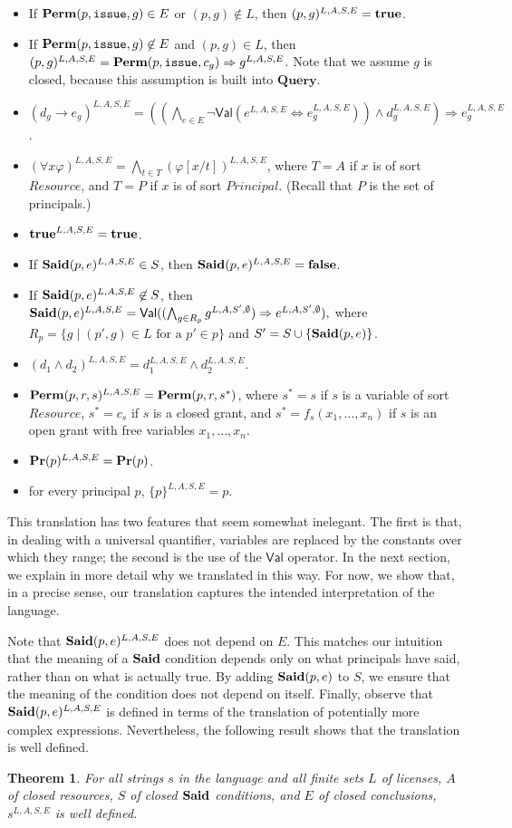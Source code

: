 \documentclass{acmtrans2m}
\newtheorem{theorem}{Theorem}[section]
\newcommand{\thm}{\begin{theorem}}
\newcommand{\ethm}{\end{theorem}}
\newcommand{\rimp}{\Rightarrow}
\newcommand{\<}{
}
\renewcommand{\>}{\rangle}
\newcommand{\union}{\cup}
\renewcommand{\phi}{\varphi}
\newcommand{\Said}{\mathit{\bf Said}}
\newcommand{\true}{\mathit{\bf{true}}}
\newcommand{\false}{\mathit{\bf{false}}}
\newcommand{\Permitted}{\mathit{\bf Perm}}
\renewcommand{\Pr}{\mathit{\bf Pr}}
\newcommand{\cd}{d}
\newcommand{\scd}{S}
\newcommand{\cc}{e}
\newcommand{\scc}{E}
\newcommand{\issue}{\mathtt{issue}}
\newcommand{\imp}{\rightarrow}
\newcommand{\XProc}{\textbf{Query}}
\newcommand{\Princ}{\mathit{Principal}}
\newcommand{\Rsrc}{\mathit{Resource}}
\newcommand{\Val}{\mathsf{Val}}
\newcommand{\Eql}[2]{\mathsf{Val}(#1 \iff #2)}
\newcommand{\transwithE}[5]{#1^{#2, #3, #4, #5}}
\newcommand{\tranwithE}[1]{#1^{L, A, \scd, \scc}}
\renewcommand{\iff}{\Leftrightarrow}
\begin{document}
\begin{itemize}
\item If $\Permitted(p, \issue, g)\in \scc$ or $(p, g)\not\in L$, then $\tranwithE{(p, g)} = \true$.
\item If $\Permitted(p, \issue, g)\not\in \scc$ and $(p, g)\in L$, then $\tranwithE{(p, g)} =
\Permitted(p, \issue, c_g) \rimp\tranwithE{g}$.  Note that we assume $g$ is closed, because this
assumption is built into $\XProc$.
\item $\tranwithE{(\cd_g\imp\cc_g)} = ((\bigwedge_{\cc\in\scc}\neg\Eql{\tranwithE{\cc}}
{\tranwithE{\cc_g}})\land \tranwithE{\cd_g})\rimp\tranwithE{\cc_g}$.
\item $\tranwithE{(\forall x \phi)} = \bigwedge_{t\in T}(\tranwithE{\phi[x/t])}$, where $T = A$ if
$x$ is of sort $\Rsrc$, and $T = P$ if $x$ is of sort $\Princ$.  (Recall that $P$ is the set of
principals.)
\item $\tranwithE{\true} = \true$.
\item If $\tranwithE{\Said(p, \cc)} \in S$, then $\tranwithE{\Said(p, \cc)} = \false$.
\item If $\tranwithE{\Said(p, \cc)} \not\in S$, then
$\tranwithE{\Said(p, \cc)} = \Val((\bigwedge_{g\in R_p}\transwithE{g}{L}{A}{\scd'}{\emptyset})\rimp
\transwithE{\cc}{L}{A}{\scd'}{\emptyset}),$ where 
$R_p = \{g \mid (p', g)\in L \mbox{ for a }p'\in p\}$
and $\scd' = S \union\{\Said(p, \cc)\}$.
\item $\tranwithE{(\cd_1\land \cd_2)} = \tranwithE{\cd_1}\land \tranwithE{\cd_2}$.
\item $\tranwithE{\Permitted(p, r, s)} = \Permitted(p, r, s^*)$, where $s^* = s$ if $s$ is a variable
of sort $\Rsrc$, $s^* = c_s$ if $s$ is a closed grant, and $s^{*} = f_s(x_1, \ldots, x_n)$ if $s$ is an
open grant with free variables $x_1, \ldots, x_n$.
\item $\tranwithE{\Pr(p)} = \Pr(p)$.
\item for every principal $p$, $\tranwithE{\{p\}} = p$.
\end{itemize}
This translation has two features that seem somewhat inelegant.  The
first is that, in dealing with 
a universal quantifier, variables are replaced by the
constants over which they range; the second is the use of the $\Val$
operator.  In the next section, we explain in more detail why we
translated in this way.  For now, we show that, in a precise sense, our
translation captures the intended interpretation of the language.

Note that $\tranwithE{\Said(p, \cc)}$ does not depend on $\scc$.  This matches our intuition that the
meaning of a $\Said$ condition depends only on what principals have said, rather than on what is
actually true.  By adding $\Said(p, \cc)$ to $S$, we ensure that the meaning of the condition does not
depend on itself.  Finally, observe that $\tranwithE{\Said(p, \cc)}$ is defined in terms of the
translation of potentially more complex expressions.  Nevertheless, the following result shows that
the translation is well defined.
\thm\label{t:trans1}
For all strings $s$ in the language and all finite sets $L$ of licenses,
$A$ of closed resources, $\scd$ 
of closed $\Said$ conditions, and $\scc$ of closed conclusions,
$\tranwithE{s}$ is well defined. 
\ethm
\end{document}
